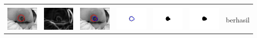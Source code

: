 \begin{table}[H]
\begin{tabular}{|m{0.7in}|m{0.7in}|m{0.7in}|m{0.7in}|m{0.7in}|m{0.7in}|m{0.7in}|}
		&  &  & & & &  \\
		\includegraphics[width=0.7in]{dataset/dataset_3/luka_merah/ready/39_interp_init.jpg}&
		\includegraphics[width=0.7in]{dataset/dataset_3/luka_merah/ready/39_interp_ext.jpg}&
		\includegraphics[width=0.7in]{dataset/dataset_3/luka_merah/ready/39_interp_result.jpg}&
		\includegraphics[width=0.7in]{dataset/dataset_3/luka_merah/ready/39_gt_r.jpg}&
		\includegraphics[width=0.7in]{dataset/dataset_3/luka_merah/ready/39_r.jpg}&
		\includegraphics[width=0.7in]{dataset/dataset_3/luka_merah/ready/39_interp_r.jpg}&
		berhasil\\
		\hline
		

\end{tabular}
\end{table}
